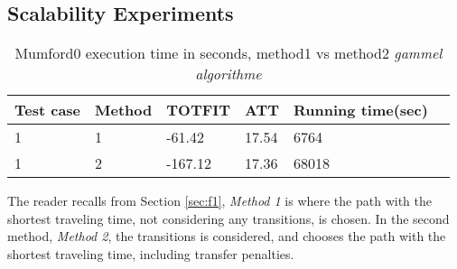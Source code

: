 \subsection{Scalability Experiments}
\label{subsec:scalabilityExperiments_results}

\begin{table}[H]
    \centering
    \begin{tabular}{|l|l|l|l|l|l|}
        \hline
        Test case & Method & TOTFIT & ATT & Running time(sec) \\
        \hline
        1 & 1 & -61.42 & 17.54 & 6764 \\
        1 & 2 & -167.12 & 17.36 & 68018 \\
        
        \hline
    \end{tabular}
    \caption{Mumford0 execution time in seconds, method1 vs method2 \emph{\color{blue} gammel algorithme}}
    \label{table:results_mumford}
\end{table}

The reader recalls from Section \vref{sec:f1},  \textit{Method 1} is where the path with the shortest traveling time, not considering any transitions, is chosen. In the second method, \textit{Method 2}, the transitions is considered, and chooses the path with the shortest traveling time, including transfer penalties.



